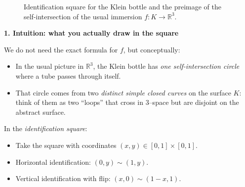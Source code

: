 \begin{solution}
\begin{figure}[htbp]
	\caption{Identification square for the Klein bottle and the preimage
		of the self-intersection of the usual immersion $f:K\to\mathbb{R}^3$.}
	\label{fig:klein-square-double-points}
\end{figure}

\par\medskip\noindent\textbf{1. Intuition: what you actually draw in the square}\par\smallskip


We do not need the exact formula for $f$, but conceptually:

\begin{itemize}
	\item In the usual picture in $\mathbb{R}^3$, the Klein bottle has \emph{one self-intersection circle} where a tube passes through itself.
	\item That circle comes from two \emph{distinct simple closed curves} on the surface $K$: think of them as two ``loops'' that cross in $3$--space but are disjoint on the abstract surface.
\end{itemize}

In the \emph{identification square}:

\begin{itemize}
	\item Take the square with coordinates $(x,y)\in[0,1]\times[0,1]$.
	\item Horizontal identification: $(0,y)\sim(1,y)$.
	\item Vertical identification with flip: $(x,0)\sim(1-x,1)$.
\end{itemize}


\end{solution}
